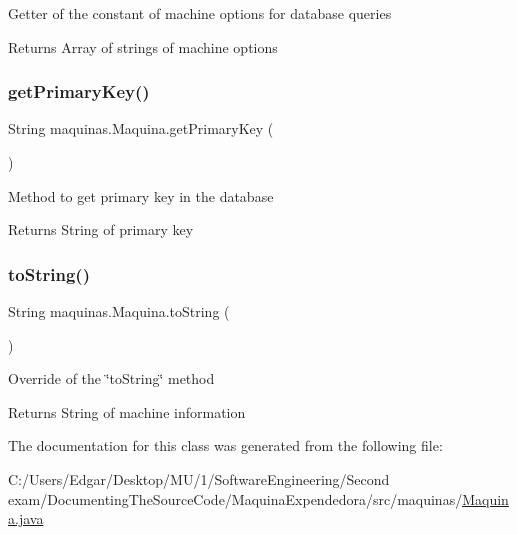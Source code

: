 Getter of the constant of machine options for database queries

\begin{DoxyReturn}{Returns}
Array of strings of machine options 
\end{DoxyReturn}
\mbox{\label{classmaquinas_1_1_maquina_a96e2d5af0f84acd39c23cc43d513f3ee}} 
\subsubsection{\texorpdfstring{get\+Primary\+Key()}{getPrimaryKey()}}
{\footnotesize\ttfamily String maquinas.\+Maquina.\+get\+Primary\+Key (\begin{DoxyParamCaption}{ }\end{DoxyParamCaption})\hspace{0.3cm}{\ttfamily [inline]}}

Method to get primary key in the database

\begin{DoxyReturn}{Returns}
String of primary key 
\end{DoxyReturn}
\mbox{\label{classmaquinas_1_1_maquina_ada0867d43ce0cbaf143f33f8104f8e12}} 
\subsubsection{\texorpdfstring{to\+String()}{toString()}}
{\footnotesize\ttfamily String maquinas.\+Maquina.\+to\+String (\begin{DoxyParamCaption}{ }\end{DoxyParamCaption})\hspace{0.3cm}{\ttfamily [inline]}}

Override of the \char`\"{}to\+String\char`\"{} method \begin{DoxyReturn}{Returns}
String of machine information 
\end{DoxyReturn}


The documentation for this class was generated from the following file\+:\begin{DoxyCompactItemize}
\item 
C\+:/\+Users/\+Edgar/\+Desktop/\+M\+U/1/\+Software\+Engineering/\+Second exam/\+Documenting\+The\+Source\+Code/\+Maquina\+Expendedora/src/maquinas/\mbox{\hyperlink{_maquina_8java}{Maquina.\+java}}\end{DoxyCompactItemize}
